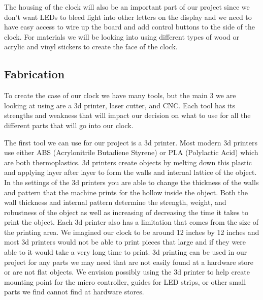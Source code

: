 \documentclass[10pt,draftclsnofoot,onecolumn]{IEEEtran}
\begin{document}
The housing of the clock will also be an important part of our project since we don’t want LEDs to bleed light into other letters on the display and we need to have easy access to wire up the board and add control buttons to the side of the clock. 
For materials we will be looking into using different types of wood or acrylic and vinyl stickers to create the face of the clock.

\subsection{Fabrication}
To create the case of our clock we have many tools, but the main 3 we are looking at using are a 3d printer, laser cutter, and CNC. 
Each tool has its strengths and weakness that will impact our decision on what to use for all the different parts that will go into our clock. 

The first tool we can use for our project is a 3d printer. 
Most modern 3d printers use either ABS (Acrylonitrile Butadiene Styrene) or PLA (Polylactic Acid) which are both thermoplastics. 
3d printers create objects by melting down this plastic and applying layer after layer to form the walls and internal lattice of the object. 
In the settings of the 3d printers you are able to change the thickness of the walls and pattern that the machine prints for the hollow inside the object. 
Both the wall thickness and internal pattern determine the strength, weight, and robustness of the object as well as increasing of decreasing the time it takes to print the object. Each 3d printer also has a limitation that comes from the size of the printing area. 
We imagined our clock to be around 12 inches by 12 inches and most 3d printers would not be able to print pieces that large and if they were able to it would take a very long time to print. 
3d printing can be used in our project for any parts we may need that are not easily found at a hardware store or are not flat objects. 
We envision possibly using the 3d printer to help create mounting point for the micro controller, guides for LED strips, or other small parts we find cannot find at hardware stores. 
\end{document}
